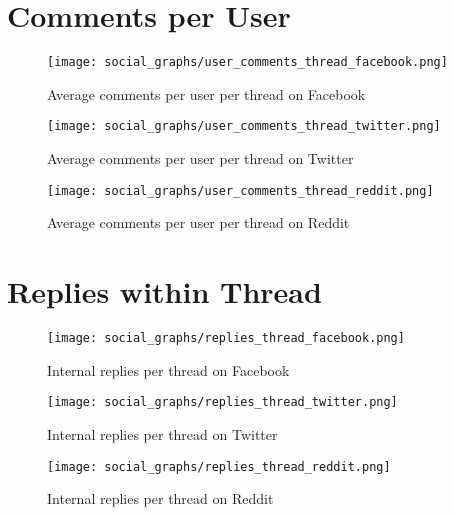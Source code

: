 \section{Comments per User}

\begin{figure}[H]
\centering
\texttt{[image: social\_graphs/user\_comments\_thread\_facebook.png]}
\caption{Average comments per user per thread on Facebook}
\label{socialgraphs:user:facebook}
\end{figure}

\begin{figure}[H]
\centering
\texttt{[image: social\_graphs/user\_comments\_thread\_twitter.png]}
\caption{Average comments per user per thread on Twitter}
\label{socialgraphs:user:twitter}
\end{figure}

\begin{figure}[H]
\centering
\texttt{[image: social\_graphs/user\_comments\_thread\_reddit.png]}
\caption{Average comments per user per thread on Reddit}
\label{socialgraphs:user:reddit}
\end{figure}


\section{Replies within Thread}
\begin{figure}[H]
\centering
\texttt{[image: social\_graphs/replies\_thread\_facebook.png]}
\caption{Internal replies per thread on Facebook}
\label{socialgraphs:replies:facebook}
\end{figure}

\begin{figure}[H]
\centering
\texttt{[image: social\_graphs/replies\_thread\_twitter.png]}
\caption{Internal replies per thread on Twitter}
\label{socialgraphs:replies:twitter}
\end{figure}

\begin{figure}[H]
\centering
\texttt{[image: social\_graphs/replies\_thread\_reddit.png]}
\caption{Internal replies per thread on Reddit}
\label{socialgraphs:replies:reddit}
\end{figure}